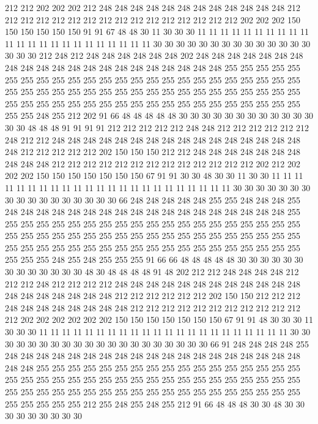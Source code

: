 212 212 202 202 202 212 248 248 248 248 248 248 248 248 248 248 248 248 212 212
212 212 212 212 212 212 212 212 212 212 212 212 212 212 202 202 202 150 150 150
150 150 150 91 91 67 48 48 30 11 30 30 30 11 11 11 11 11 11 11
11 11 11 11 11 11 11 11 11 11 11 11 11 11 11 11 30 30 30 30
30 30 30 30 30 30 30 30 30 30 30 30 30 212 248 212 248 248 248 248
248 248 202 248 248 248 248 248 248 248 248 248 248 248 248 248 248 248 248 248
248 248 248 248 255 255 255 255 255 255 255 255 255 255 255 255 255 255 255 255
255 255 255 255 255 255 255 255 255 255 255 255 255 255 255 255 255 255 255 255
255 255 255 255 255 255 255 255 255 255 255 255 255 255 255 255 255 255 255 255
255 255 255 255 255 255 255 255 248 255 212 202 91 66 48 48 48 48 48 30
30 30 30 30 30 30 30 30 30 30 30 30 30 48 48 48 91 91 91 91
212 212 212 212 212 248 248 212 212 212 212 212 212 248 212 212 248 248 248 248
248 248 248 248 248 248 248 248 248 248 248 248 248 212 212 212 212 212 202 150
150 150 212 212 248 248 248 248 248 248 248 248 248 248 212 212 212 212 212 212
212 212 212 212 212 212 212 202 212 202 202 202 150 150 150 150 150 150 150 67
91 91 30 30 48 30 30 11 30 30 11 11 11 11 11 11 11 11 11 11
11 11 11 11 11 11 11 11 11 11 11 11 11 30 30 30 30 30 30 30
30 30 30 30 30 30 30 30 30 30 66 248 248 248 248 248 255 255 248 248
248 255 248 248 248 248 248 248 248 248 248 248 248 248 248 248 248 248 248 248
255 255 255 255 255 255 255 255 255 255 255 255 255 255 255 255 255 255 255 255
255 255 255 255 255 255 255 255 255 255 255 255 255 255 255 255 255 255 255 255
255 255 255 255 255 255 255 255 255 255 255 255 255 255 255 255 255 255 255 255
255 248 255 248 255 255 255 91 66 66 48 48 48 48 48 30 30 30 30 30
30 30 30 30 30 30 30 30 48 30 48 48 48 48 91 48 202 212 212 248
248 248 248 212 212 212 248 212 212 212 212 248 248 248 248 248 248 248 248 248
248 248 248 248 248 248 248 248 248 248 212 212 212 212 212 212 202 150 150 212
212 212 248 248 248 248 248 248 248 248 212 212 212 212 212 212 212 212 212 212
212 212 202 202 202 202 202 202 150 150 150 150 150 150 150 67 91 91 48 30
30 30 11 30 30 30 11 11 11 11 11 11 11 11 11 11 11 11 11 11
11 11 11 11 11 11 11 11 30 30 30 30 30 30 30 30 30 30 30 30
30 30 30 30 30 30 30 30 66 91 248 248 248 248 255 248 248 248 248 248
248 248 248 248 248 248 248 248 248 248 248 248 248 248 248 248 255 255 255 255
255 255 255 255 255 255 255 255 255 255 255 255 255 255 255 255 255 255 255 255
255 255 255 255 255 255 255 255 255 255 255 255 255 255 255 255 255 255 255 255
255 255 255 255 255 255 255 255 255 255 255 255 255 255 255 255 212 255 248 255
248 255 212 91 66 48 48 48 30 30 48 30 30 30 30 30 30 30 30 30

